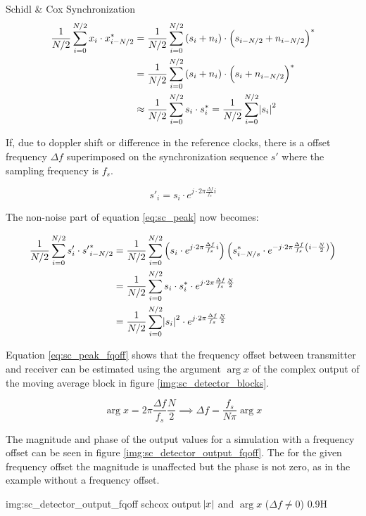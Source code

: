 \begin{subchapter}{Schidl \& Cox Synchronization}
  \begin{align}
    \label{eq:sc_peak}
    \frac{1}{N/2} \sum_{i=0}^{N/2} x_{i} \cdot x_{i-N/2}^\ast &=
    \frac{1}{N/2} \sum_{i=0}^{N/2} \left(s_{i} + n_{i} \right) \cdot \left(s_{i-N/2} + n_{i-N/2} \right)^\ast \nonumber \\
    &= \frac{1}{N/2} \sum_{i=0}^{N/2} \left(s_{i} + n_{i} \right) \cdot \left(s_{i} + n_{i-N/2} \right)^\ast \nonumber \\
    &\approx \frac{1}{N/2} \sum_{i=0}^{N/2} s_{i} \cdot s_{i}^\ast
    = \frac{1}{N/2} \sum_{i=0}^{N/2} \abs{s_{i}}^2
  \end{align}

  If, due to doppler shift or difference in the reference clocks,
  there is a offset frequency $\Delta f$ superimposed on the
  synchronization sequence $s'$ where the sampling frequency is $f_s$.

  \begin{equation*}
    s'_{i}= s_{i} \cdot e^{j\cdot 2 \pi \frac{\Delta f}{f_s}i}
  \end{equation*}

  The non-noise part of equation \ref{eq:sc_peak} now becomes:

  \begin{align}
    \label{eq:sc_peak_fqoff}
    \frac{1}{N/2} \sum_{i=0}^{N/2} s'_{i} \cdot {s'}_{i-N/2}^{\ast}
    &= \frac{1}{N/2} \sum_{i=0}^{N/2}
     \left( s_{i} \cdot e^{j\cdot 2 \pi \frac{\Delta f}{f_s}i} \right)
     \left( s_{i-N/s}^{\ast} \cdot e^{-j\cdot 2 \pi \frac{\Delta f}{f_s} \left( i- \frac{N}{2} \right)} \right) \nonumber \\
    &= \frac{1}{N/2} \sum_{i=0}^{N/2} s_{i} \cdot s_{i}^\ast \cdot e^{j\cdot 2 \pi \frac{\Delta f}{f_s} \frac{N}{2}} \nonumber \\
    &= \frac{1}{N/2} \sum_{i=0}^{N/2} \abs{s_{i}}^2 \cdot e^{j\cdot 2 \pi \frac{\Delta f}{f_s} \frac{N}{2}}
  \end{align}

  Equation \ref{eq:sc_peak_fqoff} shows that the frequency offset between transmitter
  and receiver can be estimated using the argument $\arg{x}$ of the complex output of the
  moving average block in figure \ref{img:sc_detector_blocks}.

  \begin{equation*}
    \arg{x} = 2 \pi \frac{\Delta f}{f_s} \frac{N}{2} \implies \Delta f = \frac{f_s}{N \pi} \arg{x}
  \end{equation*}

  The magnitude and phase of the output values for a simulation with a
  frequency offset can be seen in figure \ref{img:sc_detector_output_fqoff}.
  The for the given frequency offset the magnitude is unaffected but
  the phase is not zero, as in the example without a frequency offset.

               {img:sc_detector_output_fqoff}
               {\acrshort{schcox} output $\abs{x}$ and $\arg{x}$ ($\Delta f \neq 0$)}
               {0.9}{H}
\end{subchapter}
